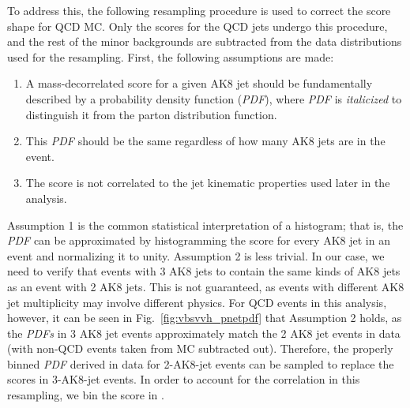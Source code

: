 To address this, the following resampling procedure is used to correct the \ParticleNet score shape for QCD MC. 
Only the scores for the QCD jets undergo this procedure, and the rest of the minor backgrounds are subtracted from the data distributions used for the resampling.
First, the following assumptions are made:
\begin{enumerate}
    \item A mass-decorrelated \ParticleNet score for a given AK8 jet should be fundamentally described by a probability density function (\textit{PDF}), where \textit{PDF} is \textit{italicized} to distinguish it from the parton distribution function.
    \item This \textit{PDF} should be the same regardless of how many AK8 jets are in the event.
    \item The \ParticleNet score is not correlated to the jet kinematic properties used later in the analysis. 
\end{enumerate}
Assumption 1 is the common statistical interpretation of a histogram; that is, the \textit{PDF} can be approximated by histogramming the \ParticleNet score for every AK8 jet in an event and normalizing it to unity. 
Assumption 2 is less trivial. 
In our case, we need to verify that events with 3 AK8 jets to contain the same kinds of AK8 jets as an event with 2 AK8 jets. 
This is not guaranteed, as events with different AK8 jet multiplicity may involve different physics. 
For QCD events in this analysis, however, it can be seen in Fig.~\ref{fig:vbsvvh_pnetpdf} that Assumption 2 holds, as the \textit{PDFs} in 3 AK8 jet events approximately match the 2 AK8 jet events in data (with non-QCD events taken from MC subtracted out).
Therefore, the properly binned \textit{PDF} derived in data for 2-AK8-jet events can be sampled to replace the \ParticleNet scores in 3-AK8-jet events. 
In order to account for the correlation in this resampling, we bin the \ParticleNet \Xtobb score in \pt. 

